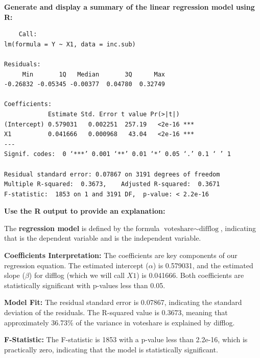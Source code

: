 \documentclass[12pt]{article}
\begin{document}
\textbf{Generate and display a summary of the linear regression model using R:}
\begin{center}
\begin{BVerbatim}
    Call:
lm(formula = Y ~ X1, data = inc.sub)

Residuals:
     Min       1Q   Median       3Q      Max 
-0.26832 -0.05345 -0.00377  0.04780  0.32749 

Coefficients:
            Estimate Std. Error t value Pr(>|t|)    
(Intercept) 0.579031   0.002251  257.19   <2e-16 ***
X1          0.041666   0.000968   43.04   <2e-16 ***
---
Signif. codes:  0 ‘***’ 0.001 ‘**’ 0.01 ‘*’ 0.05 ‘.’ 0.1 ‘ ’ 1

Residual standard error: 0.07867 on 3191 degrees of freedom
Multiple R-squared:  0.3673,	Adjusted R-squared:  0.3671 
F-statistic:  1853 on 1 and 3191 DF,  p-value: < 2.2e-16

\end{BVerbatim}
\end{center}


\textbf{Use the R output to provide an explanation:}

 The \textbf{regression model }is defined by the formula \( \text{voteshare} \sim \text{difflog} \), indicating that  is the dependent variable and  is the independent variable.


\textbf{Coefficients Interpretation:}
The coefficients are key components of our regression equation. The estimated intercept (\( \alpha \)) is 0.579031, and the estimated slope (\( \beta \)) for difflog (which we will call \( X1 \)) is 0.041666. Both coefficients are statistically significant with p-values less than 0.05.

\textbf{Model Fit:}
The residual standard error is 0.07867, indicating the standard deviation of the residuals. The R-squared value is 0.3673, meaning that approximately 36.73\% of the variance in voteshare is explained by difflog.

\textbf{F-Statistic:}
The F-statistic is 1853 with a p-value less than 2.2e-16, which is practically zero, indicating that the model is statistically significant.


 
\end{document}
